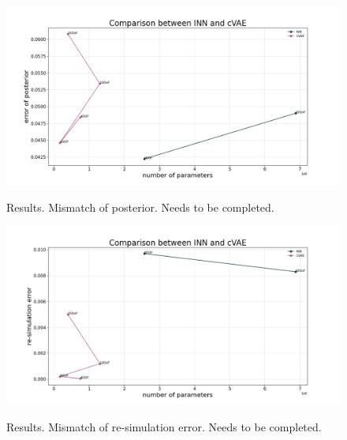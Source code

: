 \documentclass[conference]{IEEEtran}
\begin{document}
\begin{figure}[!ht]
\centering
	\includegraphics[width=\linewidth]{figures/comparison_e_posterior_alternative.jpg}
    \label{fig:plot:posterior}
    \caption{\label{fig:plot:posterior} Results. Mismatch of posterior. Needs to be completed.}
\end{figure}

\begin{figure}[!ht]
\centering
	\includegraphics[width=\linewidth]{figures/comparison_e_resim_alternative.jpg}
    \label{fig:plot:posterior}
    \caption{\label{fig:plot:resim} Results. Mismatch of re-simulation error. Needs to be completed.}
\end{figure}
\end{document}
